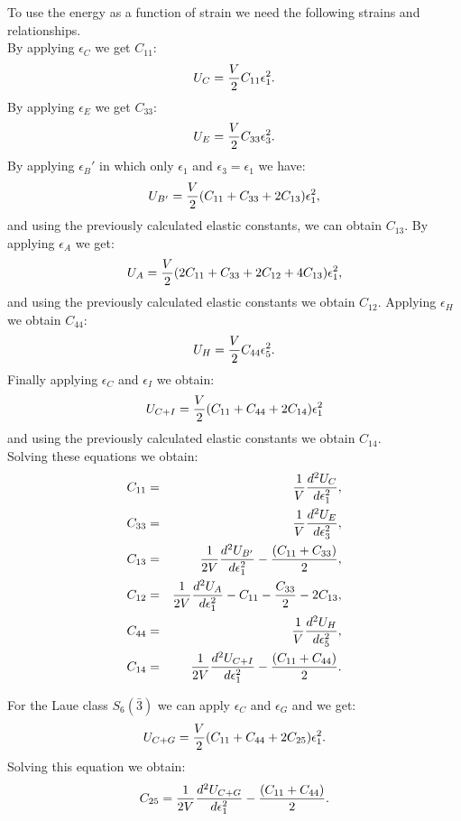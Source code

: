 \documentclass[12pt,a4paper]{article}
\begin{document}
To use the energy as a function of strain 
we need the following strains and relationships. \\
By applying $\epsilon_C$ we get $C_{11}$:
\begin{equation}
U_C = {V \over 2} C_{11} \epsilon_1^2. 
\end{equation}
By applying $\epsilon_E$ we get $C_{33}$:
\begin{equation}
U_E = {V \over 2} C_{33} \epsilon_3^2. 
\end{equation}
By applying $\epsilon_B'$ in which only $\epsilon_1$ and 
$\epsilon_3=\epsilon_1$ we have:
\begin{equation}
U_{B'} = {V \over 2} (C_{11}+C_{33}+2C_{13}) \epsilon_1^2, 
\end{equation}
and using the previously calculated elastic constants, we can obtain
$C_{13}$. By applying $\epsilon_A$ we get:
\begin{equation}
U_{A} = {V \over 2} (2C_{11}+C_{33}+2C_{12}+4C_{13}) \epsilon_1^2,
\end{equation}
and using the previously calculated elastic constants we obtain $C_{12}$.
Applying $\epsilon_H$ we obtain $C_{44}$:
\begin{equation}
U_{H} = {V \over 2} C_{44} \epsilon_5^2.
\end{equation}
Finally applying $\epsilon_C$ and $\epsilon_I$ we obtain:
\begin{equation}
U_{C+I} = {V \over 2} (C_{11} + C_{44}+ 2 C_{14}) \epsilon_1^2 
\end{equation}
and using the previously calculated elastic constants we obtain $C_{14}$. \\
Solving these equations we obtain:
\begin{eqnarray}
C_{11} &=& {1 \over V} {d^2 U_C \over d \epsilon_1^2}, \\
C_{33} &=& {1 \over V} {d^2 U_E \over d \epsilon_3^2}, \\
C_{13} &=& {1 \over 2 V} {d^2 U_{B'} \over d \epsilon_1^2} - 
{(C_{11} + C_{33})\over 2}, \\
C_{12} &=& {1 \over 2 V} {d^2 U_{A} \over d \epsilon_1^2} - 
C_{11} - {C_{33}\over 2} - 2 C_{13}, \\
C_{44} &=& {1 \over V} {d^2 U_H \over d \epsilon_5^2}, \\
C_{14} &=& {1 \over 2 V} {d^2 U_{C+I} \over d \epsilon_1^2} - 
{(C_{11} + C_{44})\over 2}. 
\end{eqnarray}

For the Laue class $S_6(\bar 3)$ we can apply 
$\epsilon_C$ and $\epsilon_G$ and we get:
\begin{equation}
U_{C+G} = {V \over 2} (C_{11} + C_{44}+ 2 C_{25}) \epsilon_1^2. 
\end{equation}
Solving this equation we obtain:
\begin{equation}
C_{25} = {1 \over 2 V} {d^2 U_{C+G} \over d \epsilon_1^2} - 
{(C_{11} + C_{44})\over 2}.
\end{equation}
\end{document}
